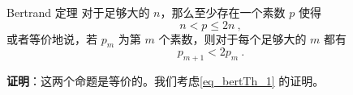 

\begin{theorem}{Bertrand 定理}
对于足够大的 $n$，那么至少存在一个素数 $p$ 使得
\begin{equation}\label{eq_bertTh_1}
n < p \le 2n ~,
\end{equation}
或者等价地说，若 $p_m$ 为第 $m$ 个素数，则对于每个足够大的 $m$ 都有
\begin{equation}
p_{m+1} < 2 p_m ~.
\end{equation}

\end{theorem}

\textbf{证明}：这两个命题是等价的。我们考虑\autoref{eq_bertTh_1} 的证明。




